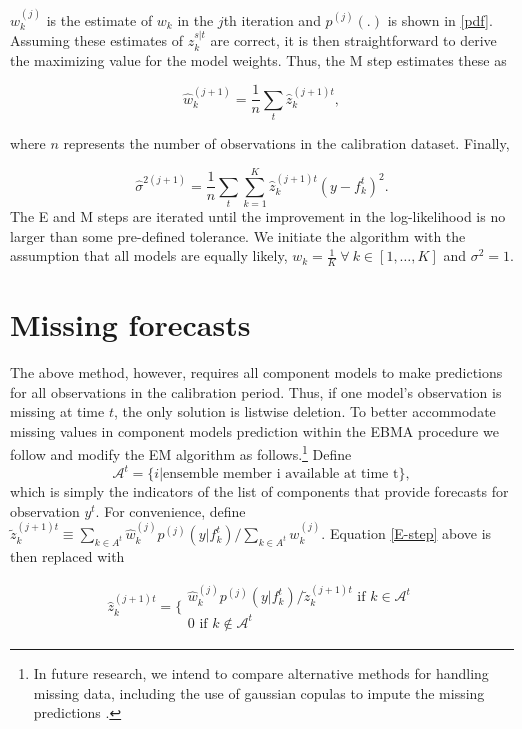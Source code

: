 \documentclass[12pt,fullpage,endnotes]{article}
\begin{document}
$w_k^{(j)}$ is the estimate of $w_k$ in the $j$th iteration and
$p^{(j)}(.)$ is shown in \eqref{pdf}.  Assuming these estimates of
$z_{k}^{s|t}$ are correct, it is then straightforward to derive the
maximizing value for the model weights. Thus, the M step estimates
these as 

\begin{equation}
\label{M-step}
\hat{w}^{(j+1)}_k=\frac{1}{n}\underset{t}{\sum}\hat{z}^{(j+1)t}_{k},
\end{equation}

\noindent where $n$ represents the number of observations in the
calibration dataset.  Finally,

\begin{equation}
\label{sigma}
\hat{\sigma}^{2(j+1)}=\frac{1}{n}\underset{t}{\sum}\overset{K}{\underset{k=1}{\sum}}\hat{z}^{(j+1)t}_{k}(y-f_{k}^{t})^2.
\end{equation}
\noindent The E and M steps are iterated until the improvement in the
log-likelihood is no larger than some pre-defined tolerance.  We
initiate the algorithm with the assumption that all models are equally
likely, $w_k = \frac{1}{K} ~ \forall ~ k \in [1, \ldots, K]$ and
$\sigma^2=1$.


\section{Missing forecasts}
\label{missing}
The above method, however, requires all component models to make
predictions for all observations in the calibration period. Thus, if
one model's observation is missing at time $t$, the only solution is
listwise deletion. To better accommodate missing values in component
models prediction within the EBMA procedure we follow
\citet{Fraley:2010} and modify the EM algorithm as
follows.\footnote{In future research, we intend to compare alternative
  methods for handling missing data, including the use of gaussian
  copulas to impute the missing predictions \citep{Hoff:2007}.}
Define $$\mathcal{A}^t = \{i|\mbox{ensemble member i available at time
  t}\},$$\noindent which is simply the indicators of the list of
components that provide forecasts for observation $y^t$.  For
convenience, define $\tilde{z}_k^{(j+1)t} \equiv {{\underset{k \in
      A^t}{\sum}}\hat{w}^{(j)}_kp^{(j)}(y|f_{k}^{t})}/{\underset{k \in
    A^t}\sum w_k^{(j)}}$.  Equation \ref{E-step} above is then
replaced with

\begin{equation}
\hat{z}^{(j+1)t}_{k} = \Bigg\{ \begin{array}{c} {\hat{w}^{(j)}_k p^{(j)}(y|f_{k}^{t})}/{\tilde{z}_k^{(j+1)t} } \mbox{ if } k \in \mathcal{A}^t\\ 0 \mbox{ if } k \notin \mathcal{A}^t \end{array}
\end{equation}
\end{document}
